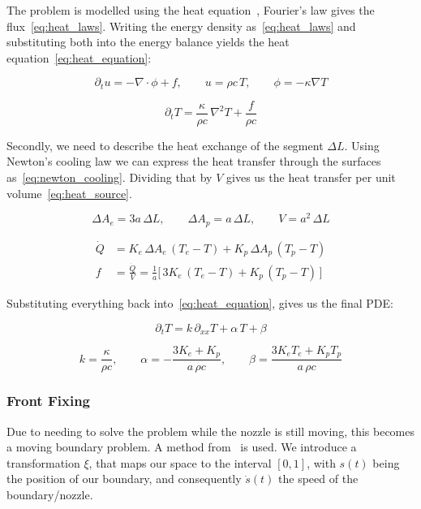 The problem is modelled using the heat equation~\cite{vandenboom2026modeling}, Fourier's law gives the flux~\eqref{eq:heat_laws}. Writing the energy density as~\eqref{eq:heat_laws} and substituting both into the energy balance yields the heat equation~\eqref{eq:heat_equation}:

\begin{equation}
\label{eq:heat_laws}
\partial_t u = -\nabla\cdot\phi + f, \qquad
u = \rho c\,T, \qquad
\phi = -\kappa \nabla T
\end{equation}

\begin{equation}
\label{eq:heat_equation}
\partial_t T = \frac{\kappa}{\rho c}\,\nabla^2 T + \frac{f}{\rho c}
\end{equation}

Secondly, we need to describe the heat exchange of the segment $\Delta L$. Using Newton's cooling law we can express the heat transfer through the surfaces as~\eqref{eq:newton_cooling}. Dividing that by $V$ gives us the heat transfer per unit volume~\eqref{eq:heat_source}.

\begin{equation*}
\Delta A_e = 3a\,\Delta L, \qquad \Delta A_p = a\,\Delta L, \qquad V = a^2\,\Delta L
\end{equation*}

\begin{align}
\dot Q &= K_e\,\Delta A_e\,(T_e - T) + K_p\,\Delta A_p\,(T_p - T)
  \label{eq:newton_cooling} \\
f &= \frac{\dot Q}{V} = \frac{1}{a}\Big[\,3K_e\,(T_e - T) + K_p\,(T_p - T)\,\Big]
  \label{eq:heat_source}
\end{align}

Substituting everything back into~\eqref{eq:heat_equation}, gives us the final PDE:

\begin{equation}
\label{eq:filament_pde}
\boxed{\partial_t T = k\,\partial_{xx} T + \alpha\,T + \beta}
\end{equation}

\begin{equation*}
k = \frac{\kappa}{\rho c}, \qquad
\alpha = -\frac{3K_e + K_p}{a\,\rho c}, \qquad
\beta = \frac{3K_e T_e + K_p T_p}{a\,\rho c}
\end{equation*}
 
\subsubsection*{Front Fixing}
Due to needing to solve the problem while the nozzle is still moving, this becomes a moving boundary problem. A method from~\cite{crank1984free} is used. We introduce a transformation $\xi$, that maps our space to the interval $[0, 1]$, with $s(t)$ being the position of our boundary, and consequently $\dot s(t)$ the speed of the boundary/nozzle.


